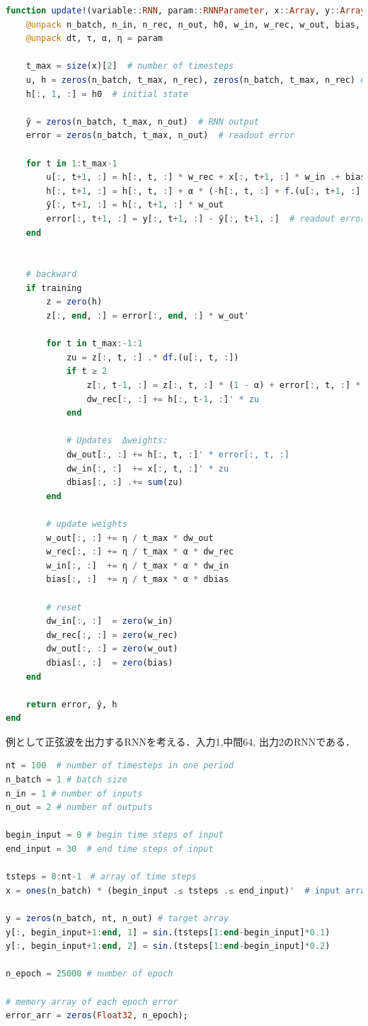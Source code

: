 \begin{lstlisting}[language=julia]
function update!(variable::RNN, param::RNNParameter, x::Array, y::Array, training::Bool)
    @unpack n_batch, n_in, n_rec, n_out, h0, w_in, w_rec, w_out, bias, dw_in, dw_rec, dw_out, dbias = variable 
    @unpack dt, τ, α, η = param

    t_max = size(x)[2]  # number of timesteps
    u, h = zeros(n_batch, t_max, n_rec), zeros(n_batch, t_max, n_rec) # input (feedforward + recurrent), time-dependent RNN activity vector
    h[:, 1, :] = h0  # initial state

    ŷ = zeros(n_batch, t_max, n_out)  # RNN output
    error = zeros(n_batch, t_max, n_out)  # readout error

    for t in 1:t_max-1
        u[:, t+1, :] = h[:, t, :] * w_rec + x[:, t+1, :] * w_in .+ bias
        h[:, t+1, :] = h[:, t, :] + α * (-h[:, t, :] + f.(u[:, t+1, :]))
        ŷ[:, t+1, :] = h[:, t+1, :] * w_out 
        error[:, t+1, :] = y[:, t+1, :] - ŷ[:, t+1, :]  # readout error
    end
    
    
    # backward
    if training 
        z = zero(h)
        z[:, end, :] = error[:, end, :] * w_out' 

        for t in t_max:-1:1
            zu = z[:, t, :] .* df.(u[:, t, :])
            if t ≥ 2
                z[:, t-1, :] = z[:, t, :] * (1 - α) + error[:, t, :] * w_out' + zu * w_rec * α
                dw_rec[:, :] += h[:, t-1, :]' * zu
            end

            # Updates  Δweights:
            dw_out[:, :] += h[:, t, :]' * error[:, t, :]
            dw_in[:, :]  += x[:, t, :]' * zu
            dbias[:, :] .+= sum(zu)
        end
        
        # update weights
        w_out[:, :] += η / t_max * dw_out
        w_rec[:, :] += η / t_max * α * dw_rec
        w_in[:, :]  += η / t_max * α * dw_in
        bias[:, :]  += η / t_max * α * dbias
        
        # reset
        dw_in[:, :]  = zero(w_in)
        dw_rec[:, :] = zero(w_rec)
        dw_out[:, :] = zero(w_out)
        dbias[:, :]  = zero(bias)
    end

    return error, ŷ, h
end
\end{lstlisting}
例として正弦波を出力するRNNを考える．入力1,中間64, 出力2のRNNである．
\begin{lstlisting}[language=julia]
nt = 100  # number of timesteps in one period
n_batch = 1 # batch size
n_in = 1 # number of inputs
n_out = 2 # number of outputs

begin_input = 0 # begin time steps of input
end_input = 30  # end time steps of input

tsteps = 0:nt-1　# array of time steps
x = ones(n_batch) * (begin_input .≤ tsteps .≤ end_input)'  # input array

y = zeros(n_batch, nt, n_out) # target array
y[:, begin_input+1:end, 1] = sin.(tsteps[1:end-begin_input]*0.1)
y[:, begin_input+1:end, 2] = sin.(tsteps[1:end-begin_input]*0.2)

n_epoch = 25000 # number of epoch

# memory array of each epoch error
error_arr = zeros(Float32, n_epoch); 
\end{lstlisting}
